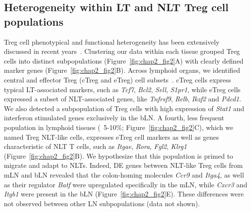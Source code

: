 \subsection{Heterogeneity within LT and NLT Treg cell populations}
\label{section2.2.2}
Treg cell phenotypical and functional heterogeneity has been extensively discussed in recent years~\citep{Josefowicz2012-nh,Campbell2011-uc}. Clustering our data within each tissue grouped Treg cells into distinct subpopulations (Figure~\ref{fig:chap2_fig2}A) with clearly defined marker genes (Figure~\ref{fig:chap2_fig2}B). Across lymphoid organs, we identified central and effector Treg (cTreg and eTreg) cell subsets~\citep{Cretney2011-zd,Vasanthakumar2015-jw}. cTreg cells express typical LT-associated markers, such as \textit{Tcf7}, \textit{Bcl2}, \textit{Sell}, \textit{S1pr1}, while eTreg cells expressed a subset of NLT-associated genes, like \textit{Tnfrsf9}, \textit{Relb}, \textit{Ikzf2} and \textit{Pdcd1}. We also detected a subpopulation of Treg cells with high expression of \textit{Stat1} and interferon stimulated genes exclusively in the bLN. A fourth, less frequent population in lymphoid tissues (~5-10\%; Figure~\ref{fig:chap2_fig2}C), which we named Treg NLT-like cells, expresses eTreg cell markers as well as genes characteristic of NLT T cells, such as \textit{Itgae}, \textit{Rora}, \textit{Fgl2}, \textit{Klrg1} (Figure~\ref{fig:chap2_fig2}B). We hypothesize that this population is primed to migrate and adapt to NLTs. Indeed, DE genes between NLT-like Treg cells from mLN and bLN revealed that the colon-homing molecules \textit{Ccr9} and \textit{Itga4}, as well as their regulator \textit{Batf} were upregulated specifically in the mLN, while \textit{Cxcr3} and \textit{Itgb1} were present in the bLN (Figure~\ref{fig:chap2_fig2}E). These differences were not observed between other LN subpopulations (data not shown).


